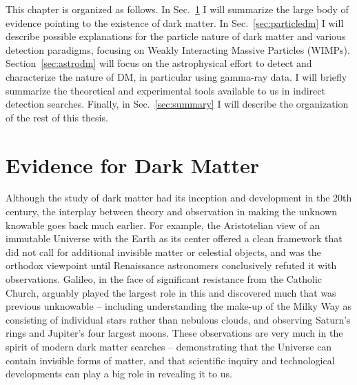 This chapter is organized as follows. In Sec.~\ref{sec:evidence} I will summarize the large body of evidence pointing to the existence of dark matter. In Sec.~\ref{sec:particledm} I will describe possible explanations for the particle nature of dark matter and various detection paradigms, focusing on Weakly Interacting Massive Particles (WIMPs). Section~\ref{sec:astrodm} will focus on the astrophysical effort to detect and characterize the nature of DM, in particular using gamma-ray data. I will briefly summarize the theoretical and experimental tools available to us in indirect detection searches. Finally, in Sec.~\ref{sec:summary} I will describe the organization of the rest of this thesis. %

\section{Evidence for Dark Matter}
\label{sec:evidence}

Although the study of dark matter had its inception and development in the 20th century, the interplay between theory and observation in making the unknown knowable goes back much earlier. For example, the Aristotelian view of an immutable Universe with the Earth as its center offered a clean framework that did not call for additional invisible matter or celestial objects, and was the orthodox viewpoint until Renaissance astronomers conclusively refuted it with observations. Galileo, in the face of significant resistance from the Catholic Church, arguably played the largest role in this and discovered much that was previous unknowable -- including understanding the make-up of the Milky Way as consisting of individual stars rather than nebulous clouds, and observing Saturn's rings and Jupiter's four largest moons. These observations are very much in the spirit of modern dark matter searches -- demonstrating that the Universe can contain invisible forms of matter, and that scientific inquiry and technological developments can play a big role in revealing it to us.



